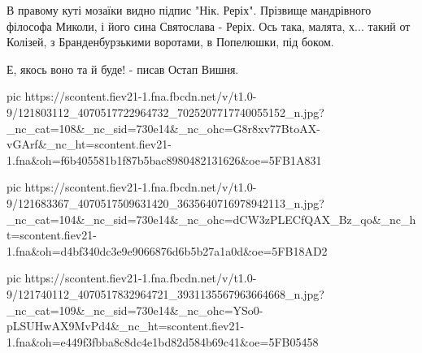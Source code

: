 В правому куті мозаїки видно підпис "Нік. Реріх".  Прізвище мандрівного
філософа Миколи, і його сина Святослава - Реріх.  Ось така, малята, х... такий от
Колізей, з Бранденбурзькими воротами, в Попелюшки, під боком.

Е, якось воно та й буде! - писав Остап Вишня.

\ifcmt
pic https://scontent.fiev21-1.fna.fbcdn.net/v/t1.0-9/121803112_4070517722964732_7025207717740055152_n.jpg?_nc_cat=108&_nc_sid=730e14&_nc_ohc=G8r8xv77BtoAX-vGArf&_nc_ht=scontent.fiev21-1.fna&oh=f6b405581b1f87b5bac8980482131626&oe=5FB1A831

pic https://scontent.fiev21-1.fna.fbcdn.net/v/t1.0-9/121683367_4070517509631420_3635640716978942113_n.jpg?_nc_cat=104&_nc_sid=730e14&_nc_ohc=dCW3zPLECfQAX_Bz_qo&_nc_ht=scontent.fiev21-1.fna&oh=d4bf340dc3e9e9066876d6b5b27a1a0d&oe=5FB18AD2

pic https://scontent.fiev21-1.fna.fbcdn.net/v/t1.0-9/121740112_4070517832964721_3931135567963664668_n.jpg?_nc_cat=109&_nc_sid=730e14&_nc_ohc=YSo0-pLSUHwAX9MvPd4&_nc_ht=scontent.fiev21-1.fna&oh=e449f3fbba8c8dc4e1bd82d584b69c41&oe=5FB05458

\fi
